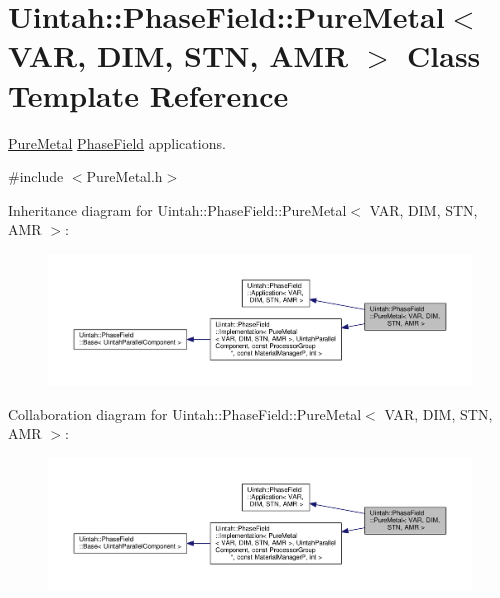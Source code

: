 \hypertarget{classUintah_1_1PhaseField_1_1PureMetal}{}\section{Uintah\+:\+:Phase\+Field\+:\+:Pure\+Metal$<$ V\+AR, D\+IM, S\+TN, A\+MR $>$ Class Template Reference}
\label{classUintah_1_1PhaseField_1_1PureMetal}


\hyperlink{classUintah_1_1PhaseField_1_1PureMetal}{Pure\+Metal} \hyperlink{namespaceUintah_1_1PhaseField}{Phase\+Field} applications.  




{\ttfamily \#include $<$Pure\+Metal.\+h$>$}



Inheritance diagram for Uintah\+:\+:Phase\+Field\+:\+:Pure\+Metal$<$ V\+AR, D\+IM, S\+TN, A\+MR $>$\+:\nopagebreak
\begin{figure}[H]
\begin{center}
\leavevmode
\includegraphics[width=350pt]{classUintah_1_1PhaseField_1_1PureMetal__inherit__graph}
\end{center}
\end{figure}


Collaboration diagram for Uintah\+:\+:Phase\+Field\+:\+:Pure\+Metal$<$ V\+AR, D\+IM, S\+TN, A\+MR $>$\+:\nopagebreak
\begin{figure}[H]
\begin{center}
\leavevmode
\includegraphics[width=350pt]{classUintah_1_1PhaseField_1_1PureMetal__coll__graph}
\end{center}
\end{figure}
